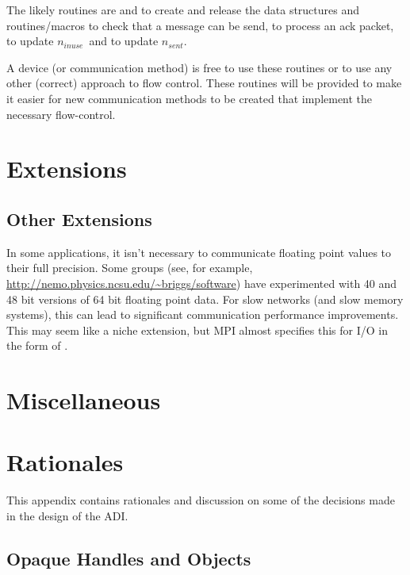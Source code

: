 \documentclass[dvipdfm]{article}
\let\findex=\index
\begin{document}
The likely routines are
 and  to create and
release the data structures and routines/macros 
to check that a message can be send,  to process
an ack packet,  to update 
\makeussubscript$n_{inuse}$\makeustext\ and
 to update \makeussubscript$n_{sent}$\makeustext.

A device (or communication method) is free to use these routines or to
use any other (correct) approach to flow control.  These routines will
be provided to make it easier for new communication methods to be
created that implement the necessary flow-control.

\section{Extensions}


\subsection{Other Extensions}
In some applications, it isn't necessary to communicate floating point values
to their full precision.  Some groups (see, for example,
\url{http://nemo.physics.ncsu.edu/~briggs/software}) have experimented with 40
and 48 bit versions of 64 bit floating point data.  For slow networks (and
slow memory systems), this can lead to significant communication performance
improvements.  This may seem like a niche extension, but MPI almost specifies
this for I/O in the form of
\findex{MPI_Register_datarep}.   

\openin{}
\ifeof\testfile\else
\section{Miscellaneous}

\fi
\closein\testfile

\appendix
\section{Rationales}
\label{sec:rationales}
This appendix contains rationales and discussion on some of the
decisions made in the design of the ADI.

\subsection{Opaque Handles and Objects}
\end{document}
